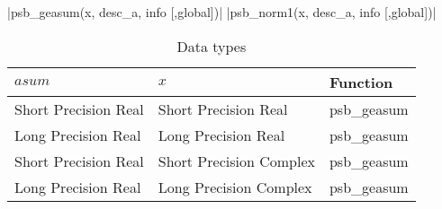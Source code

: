 \fortinline|psb_geasum(x, desc_a, info [,global])|
\fortinline|psb_norm1(x, desc_a, info [,global])|

\begin{table}[h]
\begin{center}
\begin{tabular}{lll}
\hline
$asum$ & $x$ & {\bf Function}\\
\hline
Short Precision Real&Short Precision Real & psb\_geasum \\
Long Precision Real&Long Precision Real & psb\_geasum \\
Short Precision Real&Short Precision Complex & psb\_geasum \\
Long Precision Real&Long Precision Complex & psb\_geasum \\
\hline
\end{tabular}
\end{center}
\caption{Data types\label{tab:f90asum}}
\end{table}

